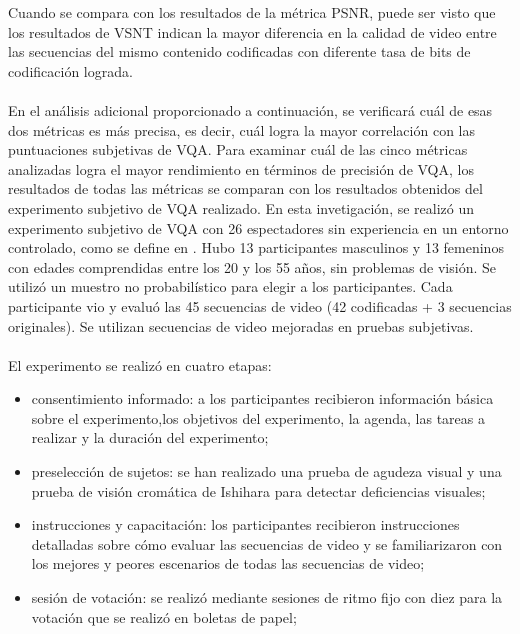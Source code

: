 \documentclass[conference]{IEEEtran}
\begin{document}
    Cuando se compara con los resultados de la métrica PSNR, puede ser 
    visto que los resultados de VSNT indican la mayor diferencia en la 
    calidad de video entre las secuencias del mismo contenido 
    codificadas con diferente tasa de bits de codificación lograda.\\
    \\
    En el análisis adicional proporcionado a continuación, se verificará 
    cuál de esas dos métricas es más precisa, es decir, cuál logra la 
    mayor correlación con las puntuaciones subjetivas de VQA. Para 
    examinar cuál de las cinco métricas analizadas logra el mayor 
    rendimiento en términos de precisión de VQA, los resultados de todas 
    las métricas se comparan con los resultados obtenidos del 
    experimento subjetivo de VQA realizado. En esta invetigación, se 
    realizó un experimento subjetivo de VQA con 26 espectadores sin 
    experiencia en un entorno controlado, como se define en \cite{biblio14}. Hubo 
    13 participantes masculinos y 13 femeninos con edades 
    comprendidas entre los 20 y los 55 años, sin problemas de visión. Se 
    utilizó un muestro no probabilístico para elegir a los participantes. 
    Cada participante vio y evaluó las 45 secuencias de video (42 
    codificadas + 3 secuencias originales). Se utilizan secuencias de 
    video mejoradas en pruebas subjetivas.\\
    \\
    El experimento se realizó en cuatro etapas:

    \begin{itemize}
        \item consentimiento informado: a los participantes  recibieron información 
            básica sobre el experimento,los objetivos del experimento, la agenda, 
            las tareas a realizar y la duración del experimento;
        \item preselección de sujetos: se han realizado una prueba de agudeza 
            visual y una prueba de visión cromática de Ishihara para detectar 
            deficiencias visuales; 
        \item instrucciones y capacitación: los participantes recibieron 
            instrucciones detalladas sobre cómo evaluar las secuencias de video 
            y se familiarizaron con los mejores y peores escenarios de todas las 
            secuencias de video;
        \item sesión de votación: se realizó mediante sesiones de 
            ritmo fijo con diez para la votación que se realizó en 
            boletas de papel;
    \end{itemize} 
\end{document}
